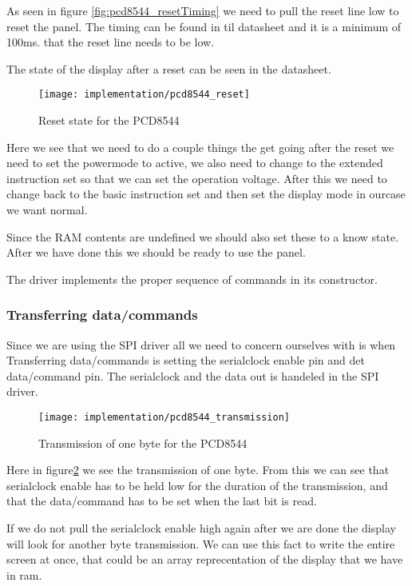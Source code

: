 As seen in figure \ref{fig:pcd8544_resetTiming} we need to pull the reset line low to reset the panel.
The timing can be found in til datasheet and it is a minimum of 100ms. that the reset line needs to be low.


The state of the display after a reset can be seen in the datasheet.

\begin{figure}
	\centering
	\texttt{[image: implementation/pcd8544\_reset]}
	\caption{Reset state for the PCD8544\cite[p. 15]{philips:pcd8544}}
	\label{fig:pcd8544_reset}
\end{figure}

Here we see that we need to do a couple things the get going after the reset we need to set the powermode to active,
we also need to change to the extended instruction set so that we can set the operation voltage.
After this we need to change back to the basic instruction set and then set the display mode in ourcase we want normal.

Since the RAM contents are undefined we should also set these to a know state.
After we have done this we should be ready to use the panel.

The driver implements the proper sequence of commands in its constructor.

\subsubsection{Transferring data/commands}
Since we are using the SPI driver all we need to concern ourselves with is when Transferring data/commands is setting the serialclock enable pin and det data/command pin.
The serialclock and the data out is handeled in the SPI driver.

\begin{figure}
	\centering
	\texttt{[image: implementation/pcd8544\_transmission]}
	\caption{Transmission of one byte for the PCD8544\cite[p. 12]{philips:pcd8544}}
	\label{fig:pcd8544_transmission}
\end{figure}

Here in figure\ref{fig:pcd8544_transmission} we see the transmission of one byte.
From this we can see that serialclock enable has to be held low for the duration of the transmission,
and that the data/command has to be set when the last bit is read.


If we do not pull the serialclock enable high again after we are done the display will look for another byte transmission.
We can use this fact to write the entire screen at once, that could be an array reprecentation of the display that we have in ram.


